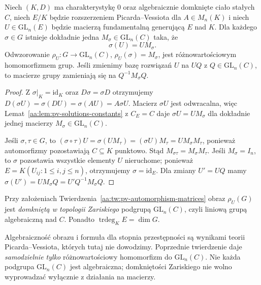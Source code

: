 \begin{twierdzenie}
\label{aa:tw:pv-automorphism-matrices}
Niech $(K,D)$ ma charakterystykę $0$
oraz algebraicznie domknięte ciało
stałych $C$, niech $E/K$ będzie
rozszerzeniem Picarda--Vessiota
dla $A\in M_n(K)$ i niech
$U\in\mathrm{GL}_n(E)$ będzie
macierzą fundamentalną
generującą $E$ nad $K$.
Dla każdego $\sigma\in G$
istnieje dokładnie jedna
$M_\sigma\in\mathrm{GL}_n(C)$ taka, że
\begin{equation}\label{aa:eq:pv-action}
 \sigma(U)=UM_\sigma.
\end{equation}
Odwzorowanie
$\rho_U:G\to\mathrm{GL}_n(C)$,
$\rho_U(\sigma)=M_\sigma$,
jest różnowartościowym
homomorfizmem grup.
Jeśli zmienimy bazę rozwiązań
$U$ na $UQ$ z
$Q\in\mathrm{GL}_n(C)$,
to macierze grupy zamieniają się
na $Q^{-1}M_\sigma Q$.
\end{twierdzenie}
\begin{proof}
Z $\sigma|_K=\mathrm{id}_K$ oraz
$D\sigma=\sigma D$ otrzymujemy
$D(\sigma U)=\sigma(DU)=\sigma(AU)=A\sigma U$.
Macierz $\sigma U$ jest odwracalna,
więc Lemat~\ref{aa:lem:pv-solutions-constants}
z $C_E=C$ daje
$\sigma U=UM_\sigma$ dla dokładnie
jednej macierzy $M_\sigma\in\mathrm{GL}_n(C)$.

Jeśli $\sigma,\tau\in G$, to
$(\sigma\circ\tau)U=\sigma(UM_\tau)
=(\sigma U)M_\tau=UM_\sigma M_\tau$,
ponieważ automorfizmy pozostawiają
$C\subseteq K$ punktowo.
Stąd $M_{\sigma\tau}=M_\sigma M_\tau$.
Jeśli $M_\sigma=I_n$, to $\sigma$
pozostawia wszystkie elementy $U$
nieruchome; ponieważ
$E=K(U_{ij}:1\le i,j\le n)$,
otrzymujemy $\sigma=\mathrm{id}_E$.
Dla zmiany $U'=UQ$ mamy
$\sigma(U')=UM_\sigma Q
=U'Q^{-1}M_\sigma Q$.
\end{proof}

\begin{twierdzenie}
\label{aa:tw:pv-algebraic-group}
Przy założeniach
Twierdzenia~\ref{aa:tw:pv-automorphism-matrices}
obraz $\rho_U(G)$ jest
\emph{domkniętą w topologii Zariskiego}
podgrupą $\mathrm{GL}_n(C)$,
czyli liniową grupą algebraiczną nad $C$.
Ponadto
$\operatorname{trdeg}_K E=\dim G$.
\end{twierdzenie}

\begin{uwaga}
\label{aa:uw:pv-algebraicity-cited}
Algebraiczność obrazu i formuła
dla stopnia przestępności są
wynikami teorii Picarda--Vessiota,
których tutaj nie dowodzimy.
Poprzednie twierdzenie daje
\emph{samodzielnie tylko} różnowartościowy
homomorfizm do $\mathrm{GL}_n(C)$.
Nie każda podgrupa $\mathrm{GL}_n(C)$
jest algebraiczna; domkniętości
Zariskiego nie wolno wyprowadzać
wyłącznie z działania na macierzy.
\end{uwaga}

